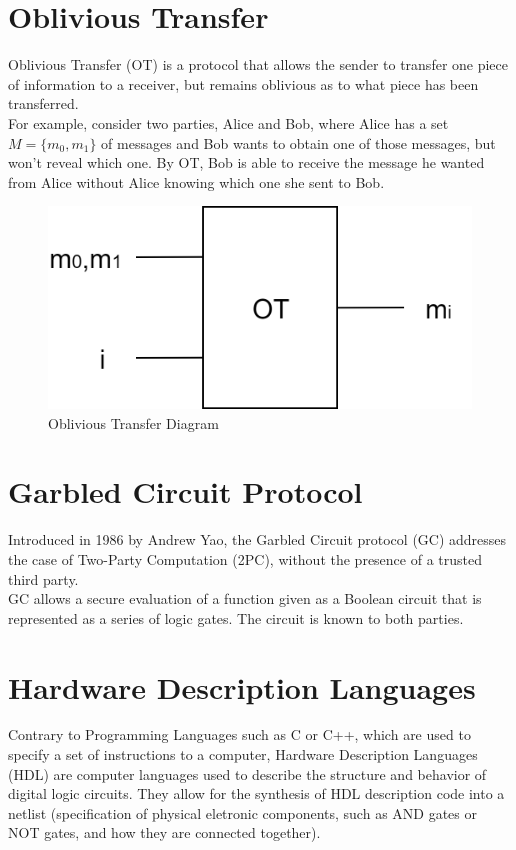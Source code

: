 \section{Oblivious Transfer}
Oblivious Transfer (OT) is a protocol that allows the sender to transfer one piece of information
to a receiver, but remains oblivious as to what piece has been transferred.\\
For example, consider two parties, Alice and Bob, where Alice has a set $M = \{m_0,m_1\}$ of messages
and Bob wants to obtain one of those messages, but won't reveal which one. By OT, Bob is able to
receive the message he wanted from Alice without Alice knowing which one she sent to Bob.

\renewcommand{\figurename}{Figure}
\begin{figure}[H]
\centering
\includegraphics[width=.4\linewidth]{./figures/mpc/OT}
\caption{Oblivious Transfer Diagram}
\label{fig:otscheme}
\end{figure}

\section{Garbled Circuit Protocol}
Introduced in 1986 by Andrew Yao, the Garbled Circuit protocol (GC) addresses the case
of Two-Party Computation (2PC), without the presence of a trusted third party.\\
GC allows a secure evaluation of a function given as a Boolean circuit that is represented as a series of logic gates.
The circuit is known to both parties.\\

\section{Hardware Description Languages}
Contrary to Programming Languages such as C or C++, which are used to specify a set of instructions to a computer, Hardware Description Languages (HDL) are computer languages used to describe the structure and behavior of digital logic circuits. They allow for the synthesis of HDL description code into a netlist (specification of physical eletronic components, such as AND gates or NOT gates, and how they are connected together).

